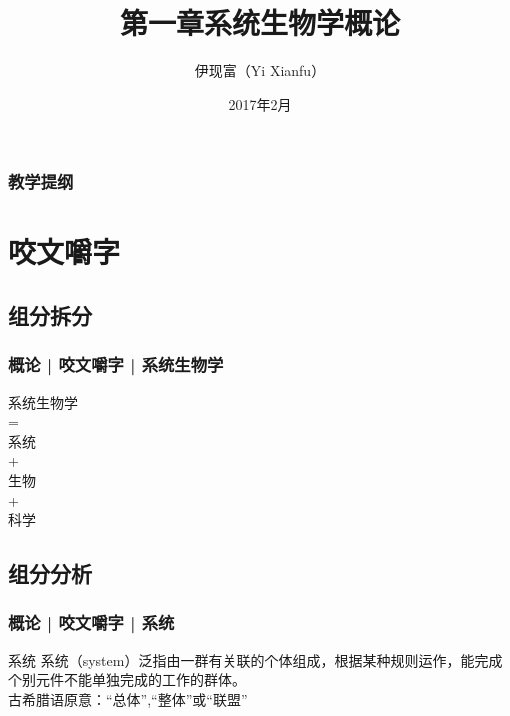 



\title[概论]{第一章\quad 系统生物学概论}
\author[Yixf]{伊现富（Yi Xianfu）}
\date{2017年2月}

%

\begin{frame}
  \titlepage
\end{frame}

\begin{frame}[plain]
  \frametitle{教学提纲}
  \setcounter{tocdepth}{3}
  \begin{multicols}{2}
    \tableofcontents
  \end{multicols}
\end{frame}


\section{咬文嚼字}
\subsection{组分拆分}
\begin{frame}
  \frametitle{概论 | 咬文嚼字 | 系统生物学}
  \begin{huge}
  \begin{center}
  系统生物学 \\ = \\ 系统 \\ + \\ 生物 \\ + \\ 科学   
\end{center}
  \end{huge}
\end{frame}

\subsection{组分分析}
\begin{frame}[t]
  \frametitle{概论 | 咬文嚼字 | 系统}
  \begin{block}{系统}
    系统（system）泛指由一群有关联的个体组成，根据某种规则运作，能完成个别元件不能单独完成的工作的群体。\\
    古希腊语原意：“总体”,“整体”或“联盟”
  \end{block}
  \pause
  \begin{figure}
    \centering
    \qquad
    \\
    \quad
    \quad
  \end{figure}
\end{frame}

